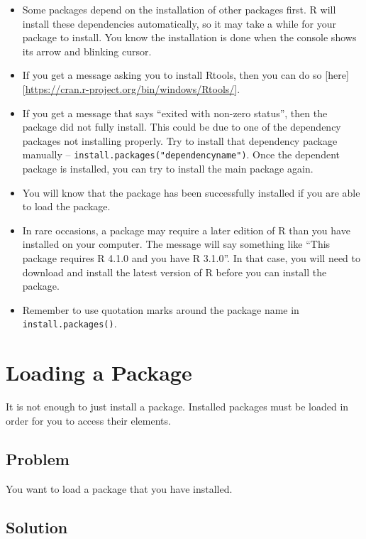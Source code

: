 \documentclass[
]{book}
\providecommand{\tightlist}{%
  \setlength{\itemsep}{0pt}\setlength{\parskip}{0pt}}
\begin{document}
\begin{itemize}
\tightlist
\item
  Some packages depend on the installation of other packages first. R will install these dependencies automatically, so it may take a while for your package to install. You know the installation is done when the console shows its arrow and blinking cursor.
\item
  If you get a message asking you to install Rtools, then you can do so {[}here{]}{[}\url{https://cran.r-project.org/bin/windows/Rtools/}{]}.
\item
  If you get a message that says ``exited with non-zero status'', then the package did not fully install. This could be due to one of the dependency packages not installing properly. Try to install that dependency package manually -- \texttt{install.packages("dependencyname")}. Once the dependent package is installed, you can try to install the main package again.
\item
  You will know that the package has been successfully installed if you are able to load the package.
\item
  In rare occasions, a package may require a later edition of R than you have installed on your computer. The message will say something like ``This package requires R 4.1.0 and you have R 3.1.0''. In that case, you will need to download and install the latest version of R before you can install the package.
\item
  Remember to use quotation marks around the package name in \texttt{install.packages()}.
\end{itemize}

\hypertarget{loadpack}{%
\section{Loading a Package}\label{loadpack}}

It is not enough to just install a package. Installed packages must be loaded in order for you to access their elements.

\hypertarget{problem-7}{%
\subsection{Problem}\label{problem-7}}

You want to load a package that you have installed.

\hypertarget{solution-7}{%
\subsection{Solution}\label{solution-7}}
\end{document}
